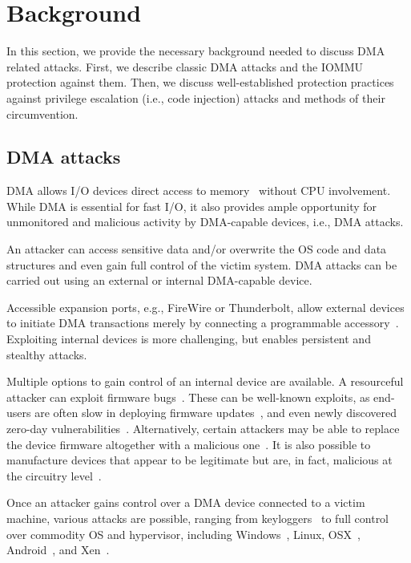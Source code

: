 \section{Background}\label{sec:background}

In this section, we provide the necessary background needed to discuss DMA related attacks. First, we describe classic DMA attacks and the IOMMU protection against them. Then, we discuss well-established protection practices against privilege escalation (i.e., code injection) attacks and methods of their circumvention.

\subsection{DMA attacks}

DMA allows I/O devices direct access to memory~\cite{oC54} without CPU involvement. While DMA is essential for fast I/O, it also provides ample opportunity for unmonitored and malicious activity by DMA-capable devices, i.e., DMA attacks. 

An attacker can access sensitive data and/or overwrite the OS code and data structures and even gain full control of the victim system. DMA attacks can be carried out using an external or internal DMA-capable device. 

Accessible expansion ports, e.g., FireWire or Thunderbolt, allow external devices to initiate DMA transactions merely by connecting a programmable accessory~\cite{Dor04, Vol, MM, thunder}. 
Exploiting internal devices is more challenging, but enables persistent and stealthy attacks. 

Multiple options to gain control of an internal device are available.
A resourceful attacker can exploit firmware bugs~\cite{SB12}. These can be well-known exploits, as end-users are often slow in deploying firmware updates~\cite{DPVL10}, and even newly discovered zero-day vulnerabilities~\cite{Ben17b}. Alternatively, certain attackers may be able to replace the device firmware altogether with a malicious one~\cite{ZKB13, NL14}. It is also possible to manufacture devices that appear to be legitimate but are, in fact, malicious at the circuitry level~\cite{YHD16}.

Once an attacker gains control over a DMA device connected to a victim machine, various attacks are possible, ranging from keyloggers~\cite{LKV13, SB12} to full control over commodity OS and hypervisor, including Windows~\cite{AD10,thunder}, Linux, OSX~\cite{Fri16, thunder}, Android~\cite{Ben17b}, and Xen~\cite{Woj08}.

